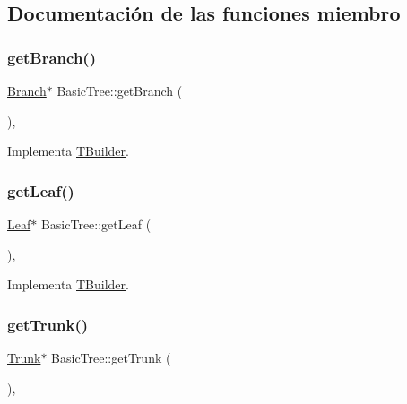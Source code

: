 \subsection{Documentación de las funciones miembro}
\mbox{\label{class_basic_tree_aeb2d743d8c5cad3c1ffdda0671447b3e}} 
\subsubsection{\texorpdfstring{getBranch()}{getBranch()}}
{\footnotesize\ttfamily \mbox{\hyperlink{class_branch}{Branch}}$\ast$ Basic\+Tree\+::get\+Branch (\begin{DoxyParamCaption}{ }\end{DoxyParamCaption})\hspace{0.3cm}{\ttfamily [inline]}, {\ttfamily [virtual]}}



Implementa \mbox{\hyperlink{class_t_builder_ad8e4d0349f04761ec667f210a9f53c4a}{T\+Builder}}.

\mbox{\label{class_basic_tree_ac7f05f760caf9e3ba9c0c07c7e16d2eb}} 
\subsubsection{\texorpdfstring{getLeaf()}{getLeaf()}}
{\footnotesize\ttfamily \mbox{\hyperlink{class_leaf}{Leaf}}$\ast$ Basic\+Tree\+::get\+Leaf (\begin{DoxyParamCaption}{ }\end{DoxyParamCaption})\hspace{0.3cm}{\ttfamily [inline]}, {\ttfamily [virtual]}}



Implementa \mbox{\hyperlink{class_t_builder_a1118b2a2449a7d7c5c5415b6bbf076cb}{T\+Builder}}.

\mbox{\label{class_basic_tree_ae2071a8f7b8eb677032ef22d0943da33}} 
\subsubsection{\texorpdfstring{getTrunk()}{getTrunk()}}
{\footnotesize\ttfamily \mbox{\hyperlink{class_trunk}{Trunk}}$\ast$ Basic\+Tree\+::get\+Trunk (\begin{DoxyParamCaption}{ }\end{DoxyParamCaption})\hspace{0.3cm}{\ttfamily [inline]}, {\ttfamily [virtual]}}



